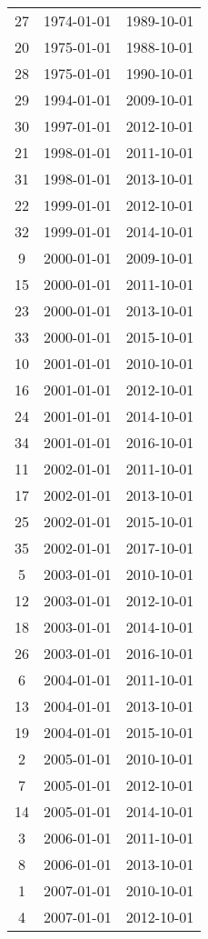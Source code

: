 % 
\begin{tabular}{ccc}
  \hline
  \hline
27 & 1974-01-01 & 1989-10-01 \\ 
  20 & 1975-01-01 & 1988-10-01 \\ 
  28 & 1975-01-01 & 1990-10-01 \\ 
  29 & 1994-01-01 & 2009-10-01 \\ 
  30 & 1997-01-01 & 2012-10-01 \\ 
  21 & 1998-01-01 & 2011-10-01 \\ 
  31 & 1998-01-01 & 2013-10-01 \\ 
  22 & 1999-01-01 & 2012-10-01 \\ 
  32 & 1999-01-01 & 2014-10-01 \\ 
  9 & 2000-01-01 & 2009-10-01 \\ 
  15 & 2000-01-01 & 2011-10-01 \\ 
  23 & 2000-01-01 & 2013-10-01 \\ 
  33 & 2000-01-01 & 2015-10-01 \\ 
  10 & 2001-01-01 & 2010-10-01 \\ 
  16 & 2001-01-01 & 2012-10-01 \\ 
  24 & 2001-01-01 & 2014-10-01 \\ 
  34 & 2001-01-01 & 2016-10-01 \\ 
  11 & 2002-01-01 & 2011-10-01 \\ 
  17 & 2002-01-01 & 2013-10-01 \\ 
  25 & 2002-01-01 & 2015-10-01 \\ 
  35 & 2002-01-01 & 2017-10-01 \\ 
  5 & 2003-01-01 & 2010-10-01 \\ 
  12 & 2003-01-01 & 2012-10-01 \\ 
  18 & 2003-01-01 & 2014-10-01 \\ 
  26 & 2003-01-01 & 2016-10-01 \\ 
  6 & 2004-01-01 & 2011-10-01 \\ 
  13 & 2004-01-01 & 2013-10-01 \\ 
  19 & 2004-01-01 & 2015-10-01 \\ 
  2 & 2005-01-01 & 2010-10-01 \\ 
  7 & 2005-01-01 & 2012-10-01 \\ 
  14 & 2005-01-01 & 2014-10-01 \\ 
  3 & 2006-01-01 & 2011-10-01 \\ 
  8 & 2006-01-01 & 2013-10-01 \\ 
  1 & 2007-01-01 & 2010-10-01 \\ 
  4 & 2007-01-01 & 2012-10-01 \\ 
   \hline
\end{tabular}
